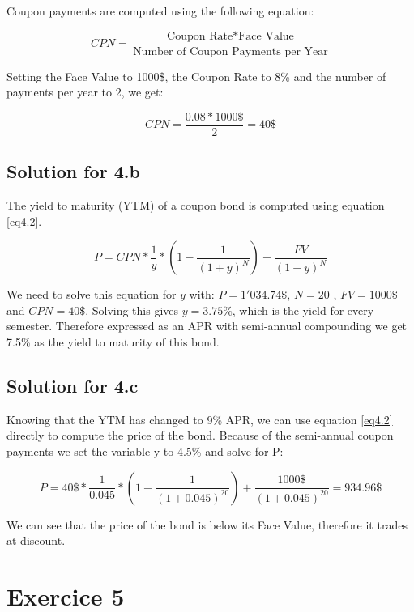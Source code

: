\documentclass[a4paper,11pt,twoside]{article}
\begin{document}
Coupon payments are computed using the following equation:

\begin{equation}
\label{eq4.1}
CPN = \frac{\text{Coupon Rate} * \text{Face Value}}{\text{Number of Coupon Payments per Year}} 
\end{equation}

Setting the Face Value to 1000\$, the Coupon Rate to 8\% and the number of payments per year to 2, we get:

\begin{equation}
CPN = \frac{0.08*1000\$}{2} = 40\$
\end{equation}

\subsection{Solution for 4.b}

The yield to maturity (YTM) of a coupon bond is computed using equation \ref{eq4.2}. 

\begin{equation}
\label{eq4.2}
P = CPN*\frac{1}{y}*(1-\frac{1}{(1+y)^N})+\frac{FV}{(1+y)^N}
\end{equation}

We need to solve this equation for $y$ with: $P = 1'034.74\$ $, $N = 20$ , $FV = 1000\$ $ and $CPN = 40\$ $. Solving this gives $y = 3.75\%$, which is the yield for every semester. Therefore expressed as an APR with semi-annual compounding we get 7.5\% as the yield to maturity of this bond.

\subsection{Solution for 4.c}

Knowing that the YTM has changed to 9\% APR, we can use equation \ref{eq4.2} directly to compute the price of the bond. Because of the semi-annual coupon payments we set the variable y to 4.5\% and solve for P:

\begin{equation}
P = 40\$*\frac{1}{0.045}*(1-\frac{1}{(1+0.045)^{20}})+\frac{1000\$}{(1+0.045)^{20}} = 934.96\$
\end{equation}

We can see that the price of the bond is below its Face Value, therefore it trades at discount.

\section{Exercice 5}
\end{document}
